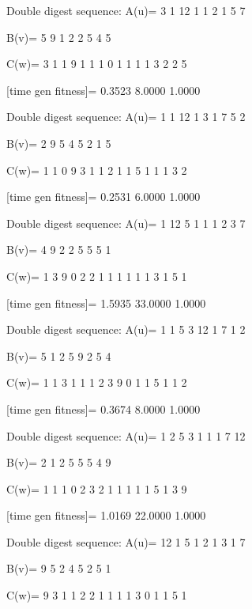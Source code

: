 Double digest sequence:
A(u)=
     3     1    12     1     1     2     1     5     7

B(v)=
     5     9     1     2     2     5     4     5

C(w)=
     3     1     1     9     1     1     1     0     1     1     1     1     3     2     2     5

[time gen fitness]=
    0.3523    8.0000    1.0000

Double digest sequence:
A(u)=
     1     1    12     1     3     1     7     5     2

B(v)=
     2     9     5     4     5     2     1     5

C(w)=
     1     1     0     9     3     1     1     2     1     1     5     1     1     1     3     2

[time gen fitness]=
    0.2531    6.0000    1.0000

Double digest sequence:
A(u)=
     1    12     5     1     1     1     2     3     7

B(v)=
     4     9     2     2     5     5     5     1

C(w)=
     1     3     9     0     2     2     1     1     1     1     1     1     3     1     5     1

[time gen fitness]=
    1.5935   33.0000    1.0000

Double digest sequence:
A(u)=
     1     1     5     3    12     1     7     1     2

B(v)=
     5     1     2     5     9     2     5     4

C(w)=
     1     1     3     1     1     1     2     3     9     0     1     1     5     1     1     2

[time gen fitness]=
    0.3674    8.0000    1.0000

Double digest sequence:
A(u)=
     1     2     5     3     1     1     1     7    12

B(v)=
     2     1     2     5     5     5     4     9

C(w)=
     1     1     1     0     2     3     2     1     1     1     1     1     5     1     3     9

[time gen fitness]=
    1.0169   22.0000    1.0000

Double digest sequence:
A(u)=
    12     1     5     1     2     1     3     1     7

B(v)=
     9     5     2     4     5     2     5     1

C(w)=
     9     3     1     1     2     2     1     1     1     1     3     0     1     1     5     1

